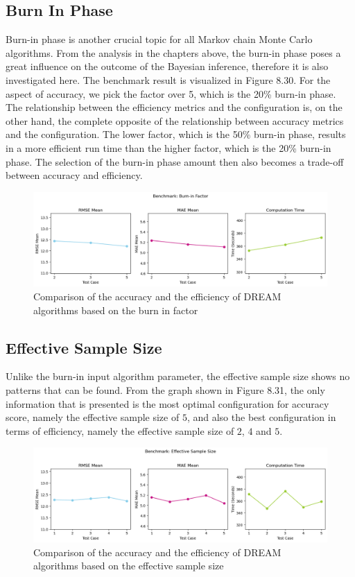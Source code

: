 \subsection{Burn In Phase}
Burn-in phase is another crucial topic for all Markov chain Monte Carlo algorithms. From the analysis in the chapters above, the burn-in phase poses a great influence on the outcome of the Bayesian inference, therefore it is also investigated here. The benchmark result is visualized in Figure 8.30. For the aspect of accuracy, we pick the factor over 5, which is the 20\% burn-in phase. The relationship between the efficiency metrics and the configuration is, on the other hand, the complete opposite of the relationship between accuracy metrics and the configuration. The lower factor, which is the 50\% burn-in phase, results in a more efficient run time than the higher factor, which is the 20\% burn-in phase. The selection of the burn-in phase amount then also becomes a trade-off between accuracy and efficiency.
\begin{figure}[H]
    \centering
    \includegraphics[width=1\textwidth]{figures/dream/burn_in.png}
    \captionsetup{width=.8\textwidth}
    \caption{Comparison of the accuracy and the efficiency of DREAM algorithms based on the burn in factor}
    \label{fig:enter-label}
\end{figure}

\subsection{Effective Sample Size}
Unlike the burn-in input algorithm parameter, the effective sample size shows no patterns that can be found. From the graph shown in Figure 8.31, the only information that is presented is the most optimal configuration for accuracy score, namely the effective sample size of $5$, and also the best configuration in terms of efficiency, namely the effective sample size of $2$, $4$ and $5$.
\begin{figure}[H]
    \centering
    \includegraphics[width=1\textwidth]{figures/dream/ess.png}
    \captionsetup{width=.8\textwidth}
    \caption{Comparison of the accuracy and the efficiency of DREAM algorithms based on the effective sample size}
    \label{fig:enter-label}
\end{figure}

